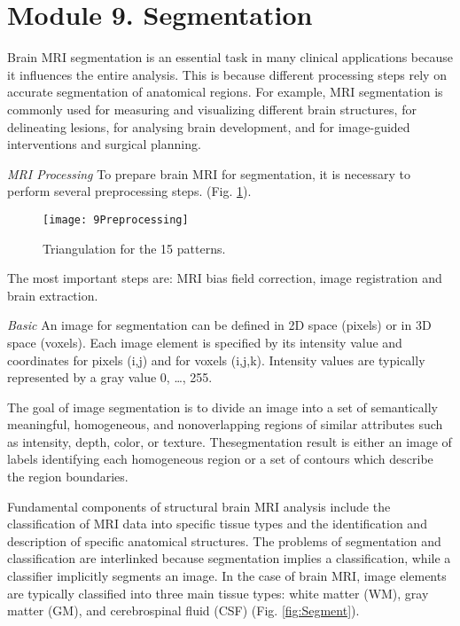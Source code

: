 \section{Module 9. Segmentation}

Brain MRI segmentation is an essential task in many clinical applications
because it influences the entire analysis. This is because different
processing steps rely on accurate segmentation of anatomical regions.
For example, MRI segmentation is commonly used for measuring and visualizing
different brain structures, for delineating lesions, for analysing
brain development, and for image-guided interventions and surgical
planning.

\textit{MRI Processing} To prepare brain MRI for segmentation, it
is necessary to perform several preprocessing steps. (Fig. \ref{fig:Preprocessing}).

\begin{figure}[H]
\centering{}\texttt{[image: 9Preprocessing]}\caption{Triangulation for the 15 patterns. \label{fig:Preprocessing}}
\end{figure}

The most important steps are: MRI bias field correction, image registration
and brain extraction.

\textit{Basic} An image for segmentation can be defined in 2D space
(pixels) or in 3D space (voxels). Each image element is specified
by its intensity value and coordinates for pixels (i,j) and for voxels
(i,j,k). Intensity values are typically represented by a gray value
{0, …, 255}.

The goal of image segmentation is to divide an image into a set of
semantically meaningful, homogeneous, and nonoverlapping regions of
similar attributes such as intensity, depth, color, or texture. Thesegmentation
result is either an image of labels identifying each homogeneous region
or a set of contours which describe the region boundaries.

Fundamental components of structural brain MRI analysis include the
classification of MRI data into specific tissue types and the identification
and description of specific anatomical structures. The problems of
segmentation and classification are interlinked because segmentation
implies a classification, while a classifier implicitly segments an
image. In the case of brain MRI, image elements are typically classified
into three main tissue types: white matter (WM), gray matter (GM),
and cerebrospinal fluid (CSF) (Fig. \ref{fig:Segment}).

